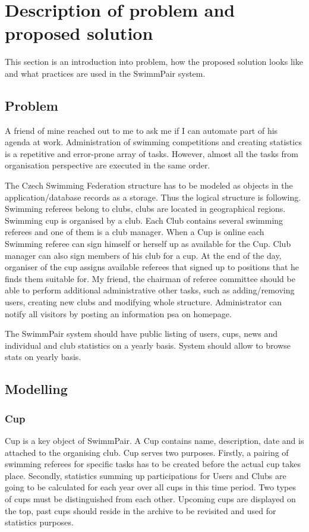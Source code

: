 \chapter{Description of problem and proposed solution}
This section is an introduction into problem, how the proposed solution looks like and what practices are used in the SwimmPair system. 
\section{Problem}
\par
A friend of mine reached out to me to ask me if I can automate part of his agenda at work. Administration of swimming competitions and creating statistics is a repetitive and error-prone array of tasks. However, almost all the tasks from organisation perspective are executed in the same order.
\par
The Czech Swimming Federation structure has to be modeled as objects in the application/database records as a storage. Thus the logical structure is following. Swimming referees belong to clubs, clubs are located in geographical regions. Swimming cup is organised by a club. Each Club contains several swimming referees and one of them is a club manager. When a Cup is online each Swimming referee can sign himself or herself up as available for the Cup. Club manager can also sign members of his club for a cup. At the end of the day, organiser of the cup assigns available referees that signed up to positions that he finds them suitable for. My friend, the chairman of referee committee should be able to perform additional administrative other tasks, such as adding/removing users, creating new clubs and modifying whole structure. Administrator can notify all visitors by posting an information psa on homepage.
\par
The SwimmPair system should have public listing of users, cups, news and individual and club statistics on a yearly basis. System should allow to browse stats on yearly basis. 


\section{Modelling}
\subsection*{Cup}
Cup is a key object of SwimmPair. A Cup contains name, description, date and is attached to the organising club. Cup serves two purposes. Firstly, a pairing of swimming referees for specific tasks has to be created before the actual cup takes place. Secondly, statistics summing up participations for Users and Clubs are going to be calculated for each year over all cups in this time period. Two types of cups must be distinguished from each other. Upcoming cups are displayed on the top, past cups should reside in the archive to be revisited and used for statistics purposes.
